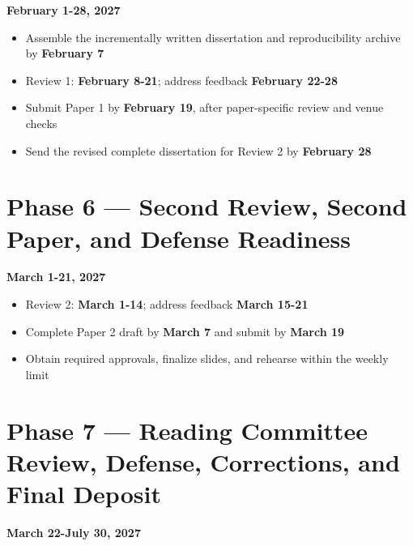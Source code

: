 \documentclass[
  12pt,
  letterpaper,
  oneside]{report}
\providecommand{\tightlist}{%
  \setlength{\itemsep}{0pt}\setlength{\parskip}{0pt}}
\begin{document}
\textbf{February 1-28, 2027}

\begin{itemize}
\tightlist
\item
  Assemble the incrementally written dissertation and reproducibility
  archive by \textbf{February 7}
\item
  Review 1: \textbf{February 8-21}; address feedback \textbf{February
  22-28}
\item
  Submit Paper 1 by \textbf{February 19}, after paper-specific review
  and venue checks
\item
  Send the revised complete dissertation for Review 2 by
  \textbf{February 28}
\end{itemize}

\section{Phase 6 --- Second Review, Second Paper, and Defense
Readiness}\label{phase-6--second-review-second-paper-and-defense-readiness}

\textbf{March 1-21, 2027}

\begin{itemize}
\tightlist
\item
  Review 2: \textbf{March 1-14}; address feedback \textbf{March 15-21}
\item
  Complete Paper 2 draft by \textbf{March 7} and submit by \textbf{March
  19}
\item
  Obtain required approvals, finalize slides, and rehearse within the
  weekly limit
\end{itemize}

\section{Phase 7 --- Reading Committee Review, Defense, Corrections,
and Final
Deposit}\label{phase-7--reading-committee-review-defense-corrections-and-final-deposit}

\textbf{March 22-July 30, 2027}
\end{document}
